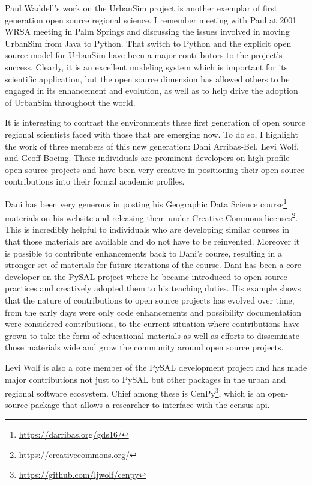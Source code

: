 \documentclass[11pt]{article}
\begin{document}
Paul Waddell's work on the UrbanSim project \citep{waddell_urbansim:_2002} is
another exemplar of first generation open source regional science. I remember
meeting with Paul at 2001 WRSA meeting in Palm Springs and discussing the
issues involved in moving UrbanSim from Java to Python. That switch to
Python and the explicit open source model for UrbanSim have been a major
contributors to the project's success. Clearly, it is an excellent modeling
system which is important for its scientific application, but the open source
dimension has allowed others to be engaged in its enhancement and evolution, as
well as to help drive the adoption of UrbanSim throughout the world.

It is interesting to contrast the environments these first generation of open
source regional scientists faced with those that are emerging now. To do so, I
highlight the work of three members of this new generation: Dani Arribas-Bel,
Levi Wolf, and Geoff Boeing. These individuals are prominent developers on
high-profile open source projects and have been very creative in positioning
their open source contributions into their formal academic profiles.

Dani has been very generous in posting his Geographic Data Science course\footnote{\url{https://darribas.org/gds16/}}
materials on his website and releasing them under Creative Commons
licenses\footnote{\url{https://creativecommons.org/}}.  This is incredibly helpful to individuals who are developing
similar courses in that those materials are available and do not have to be
reinvented. Moreover it is possible to contribute enhancements back to Dani's
course, resulting in a stronger set of materials for future iterations of the
course. Dani has been a core developer on the PySAL project where he became
introduced to open source practices and creatively adopted them to his teaching
duties. His example shows that the nature of contributions to open source
projects has evolved over time, from the early days were only code enhancements
and possibility documentation were considered contributions, to the current
situation where contributions have grown to take the form of educational
materials as well as efforts to disseminate those materials wide and grow the
community around open source projects.


Levi Wolf is also a core member of the PySAL development project and has made
major contributions not just to PySAL but other packages in the urban and
regional software ecosystem. Chief among these is CenPy\footnote{\url{https://github.com/ljwolf/cenpy}}, which is an
open-source package that allows a researcher to interface with the census api.
\end{document}
